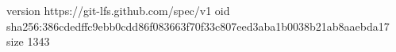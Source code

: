 version https://git-lfs.github.com/spec/v1
oid sha256:386cdedffc9ebb0cdd86f083663f70f33c807eed3aba1b0038b21ab8aaebda17
size 1343

